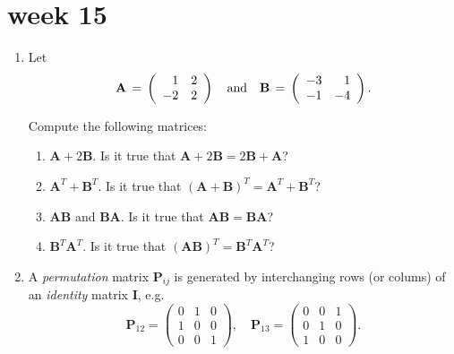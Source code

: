 \documentclass[11pt,a4paper]{article}
\def\bA{\mathbf{A}}
\def\bB{\mathbf{B}}
\def\bI{\mathbf{I}}
\def\bP{\mathbf{P}}
\begin{document}
\section*{week 15}
\begin{enumerate}

\item\label{q1167} Let
\[ \bA \,=\, \left( \begin{array}{rr} 1 &2 \\ -2 &2 \end{array} \right) \quad
\hbox{and} \quad
\bB \,=\, \left( \begin{array}{rr} -3 &1 \\ -1 &-4 \end{array} \right).\]

Compute the following matrices:
	\begin{enumerate}
	\item $\bA+ 2\bB$.  Is it true that $ \bA + 2\bB= 2\bB + \bA$?
	\item $\bA^T+  \bB^T$. Is it true that $( \bA + \bB)^T = \bA^T + \bB^T$?
	\item $\bA \bB$ and $\bB \bA$.    Is it true that $ \bA \bB= \bB \bA$?
	\item $\bB^T \bA^T$.  Is it true that $(\bA \bB)^T= \bB^T \bA^T$?
	\end{enumerate}

%

\item\label{qdjsp1}
A {\it permutation} matrix  $\bP_{ij}$ is generated by interchanging rows (or colums) 
of an {\it identity} matrix $\bI$, e.g.
$$  \bP_{12} =  \left ( \begin{array}{ccc}  0 & 1 & 0\\  1 & 0 & 0\\  0 & 0 & 1 \end{array} \right ),  \quad
  \bP_{13} =  \left ( \begin{array}{ccc}  0 & 0 & 1\\  0 & 1 & 0\\  1 & 0 & 0 \end{array} \right ).  $$


\end{enumerate}
\end{document}
